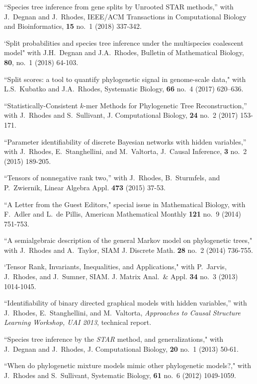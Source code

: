 \documentclass[10pt]{report}
\begin{document}
{{``Species tree inference from gene splits by Unrooted STAR methods,''
with J.~Degnan and J.~Rhodes,
IEEE/ACM Transactions in Computational Biology and Bioinformatics, 
{\bf 15} no.~1 (2018) 337-342. 
 
`Split probabilities and species tree inference under the
multispecies coalescent model"
 with J.H.~Degnan and J.A.~Rhodes,
 Bulletin of Mathematical Biology,
 {\bf 80}, no.~1 (2018) 64-103.

``Split scores: a tool to quantify phylogenetic signal in genome-scale data,"
with L.S.~Kubatko and J.A.~Rhodes,
Systematic Biology,
{\bf 66} no.~4 (2017) 620--636.

``Statistically-Consistent $k$-mer Methods for Phylogenetic Tree Reconstruction,''
with J.~Rhodes and S.~Sullivant,
J. Computational Biology,
{\bf 24} no.~2 (2017) 153-171.

``Parameter identifiability of discrete Bayesian networks with hidden variables,''
with J.~Rhodes, E.~Stanghellini, and M.~Valtorta,
J.~Causal Inference, {\bf 3} no.~2 (2015) 189-205.

``Tensors of nonnegative rank two,''
with J.~Rhodes, B.~Sturmfels, and P.~Zwiernik,
Linear Algebra Appl. {\bf 473} (2015) 37-53.

 ``A Letter from the Guest Editors," special issue in 
Mathematical Biology, 
with F.~Adler and L.~de Pillis,
American Mathematical Monthly {\bf 121} no.~9 (2014) 751-753.

``A semialgebraic description of the general Markov model on phylogenetic trees,"
with J.~Rhodes and A.~Taylor, 
SIAM J. Discrete Math. {\bf 28} no.~2 (2014) 736-755.

`Tensor Rank, Invariants, Inequalities, and Applications,"
with P.~Jarvis, J.~Rhodes, and J.~Sumner, 
SIAM. J. Matrix Anal.~\& Appl. {\bf 34}  no.~3 (2013) 1014-1045.

``Identifiability of binary directed graphical models with hidden variables,''
with J.~Rhodes, E.~Stanghellini, and M.~Valtorta,
\emph{Approaches to Causal Structure Learning
Workshop, UAI 2013}, technical report.

``Species tree inference by the \emph{STAR} method, and generalizations,"
with J.~Degnan and J.~Rhodes, J. Computational Biology, {\bf 20} no.~1 (2013) 50-61.

``When do phylogenetic mixture models mimic other phylogenetic models?," 
with J.~Rhodes and S.~Sullivant,
Systematic Biology, {\bf 61} no.~6 (2012) 1049-1059.

}}
\end{document}
